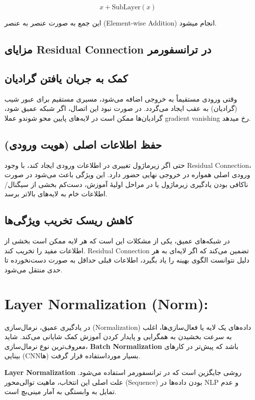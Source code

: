 \[
x + \text{SubLayer}(x)
\]

این جمع به صورت عنصر به عنصر (Element-wise Addition)  انجام میشود.


\subsection{مزایای Residual Connection در ترانسفورمر}

\subsection*{کمک به جریان یافتن گرادیان}

وقتی ورودی مستقیماً به خروجی اضافه می‌شود، مسیری مستقیم برای عبور شیب (گرادیان) به عقب ایجاد می‌گردد.
در صورت نبود این اتصال، اگر شبکه عمیق شود، گرادیان‌ها ممکن است در لایه‌های پایین محو شوندو عملا gradient vanishing رخ میدهد.

\subsection*{حفظ اطلاعات اصلی (هویت ورودی)}

حتی اگر زیرماژول تغییری در اطلاعات ورودی ایجاد کند، با وجود Residual Connection، ورودی اصلی همواره در خروجی نهایی حضور دارد.
این ویژگی باعث می‌شود در صورت ناکافی بودن یادگیری زیرماژول یا در مراحل اولیهٔ آموزش، دست‌کم بخشی از سیگنال/اطلاعات خام به لایه‌های بالاتر برسد.

\subsection*{کاهش ریسک تخریب ویژگی‌ها}

در شبکه‌های عمیق، یکی از مشکلات این است که هر لایه ممکن است بخشی از اطلاعات مفید را تخریب کند. Residual Connection تضمین می‌کند که اگر لایه‌ای به هر دلیل نتوانست الگوی بهینه را یاد بگیرد، اطلاعات قبلی حداقل به صورت دست‌نخورده تا حدی منتقل می‌شود.

\section{Layer Normalization (Norm):}

در یادگیری عمیق، نرمال‌سازی (Normalization) داده‌های یک لایه یا فعال‌سازی‌ها، اغلب به سرعت بخشیدن به همگرایی و پایدار کردن آموزش کمک شایانی می‌کند. شاید معروف‌ترین نوع نرمال‌سازی، \textbf{Batch Normalization} باشد که پیش‌تر در کارهای بینایی (CNNها) بسیار مورداستفاده قرار گرفت.

\textbf{Layer Normalization} روشی جایگزین است که در ترانسفورمر استفاده می‌شود. علت اصلی این انتخاب، ماهیت توالی‌محور (Sequence) بودن داده‌ها در NLP و عدم تمایل به وابستگی به آمار مینی‌بچ است.



